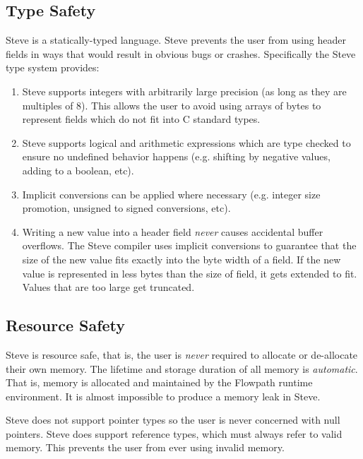 \subsection{Type Safety}

Steve is a statically-typed language. Steve prevents the user from using header
fields in ways that would result in obvious bugs or crashes. Specifically the
Steve type system provides:

\begin{enumerate}
\item Steve supports integers with arbitrarily large precision (as long as they
are multiples of 8). This allows the user to avoid using arrays of bytes to
represent fields which do not fit into C standard types.

\item Steve supports logical and arithmetic expressions which are type checked
to ensure no undefined behavior happens (e.g. shifting by negative values,
adding to a boolean, etc).

\item Implicit conversions can be applied where necessary (e.g. integer size
promotion, unsigned to signed conversions, etc).

\item Writing a new value into a header field \textit{never} causes accidental
buffer overflows. The Steve compiler uses implicit conversions to guarantee that
the size of the new value fits exactly into the byte width of a field. If the
new value is represented in less bytes than the size of field, it gets extended
to fit. Values that are too large get truncated.
\end{enumerate}

\subsection{Resource Safety}

Steve is resource safe, that is, the user is \emph{never} required to allocate
or de-allocate their own memory. The lifetime and storage duration of all memory
is \textit{automatic}. That is, memory is allocated and maintained by the
Flowpath runtime environment. It is almost impossible to produce a memory leak
in Steve.

Steve does not support pointer types so the user is never concerned with null
pointers. Steve does support reference types, which must always refer to valid
memory. This prevents the user from ever using invalid memory.

